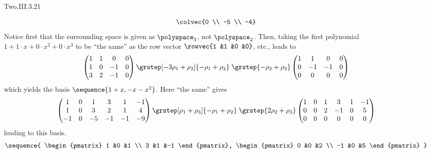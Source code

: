 \begin{ans}{Two.III.3.21}
\begin{exparts}
\begin{equation*}
{              \colvec{0 \\ -5 \\ -4}   }
          \end{equation*}
        \partsitem Notice first that the surrounding space is given as
          $\polyspace_3$, not $\polyspace_2$.
          Then, taking the first polynomial $1+1\cdot x+0\cdot x^2+0\cdot x^3$
          to be ``the same'' as the row vector $\rowvec{1 &1 &0 &0}$, etc.,
          leads to
          \begin{equation*}
            \begin{pmatrix}
              1  &1  &0  &0 \\
              1  &0  &-1 &0 \\
              3  &2  &-1 &0
            \end{pmatrix}
            \grstep[-3\rho_1+\rho_3]{-\rho_1+\rho_2}
            \;\grstep{-\rho_2+\rho_3}
            \begin{pmatrix}
              1  &1  &0  &0 \\
              0  &-1 &-1 &0 \\
              0  &0  &0  &0
            \end{pmatrix}
          \end{equation*}
          which yields the basis \( \sequence{1+x,-x-x^2} \).
        \partsitem Here ``the same'' gives
          \begin{equation*}
            \begin{pmatrix}
              1  &0  &1  &3  &1  &-1  \\
              1  &0  &3  &2  &1  &4   \\
             -1  &0  &-5  &-1 &-1 &-9
            \end{pmatrix}
            \grstep[\rho_1+\rho_3]{-\rho_1+\rho_2}
            \;\grstep{2\rho_2+\rho_3}
            \begin{pmatrix}
              1  &0  &1  &3  &1  &-1  \\
              0  &0  &2  &-1 &0  &5   \\
              0  &0  &0  &0  &0  &0
            \end{pmatrix}
          \end{equation*}
          leading to this basis.
          \begin{equation*}
            \sequence{
            \begin{pmatrix}
              1  &0  &1  \\
              3  &1  &-1
            \end{pmatrix},
            \begin{pmatrix}
              0  &0  &2  \\
             -1  &0  &5
            \end{pmatrix}  }
          \end{equation*}
      \end{exparts}
     
\end{ans}
